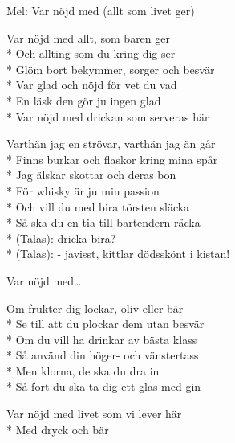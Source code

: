 \begin{SongText}
    \begin{SongInfo}
        Mel: Var nöjd med (allt som livet ger)
    \end{SongInfo}
    \begin{SongVerse}
        Var nöjd med allt, som baren ger\\*%
        Och allting som du kring dig ser\\*%
        Glöm bort bekymmer, sorger och besvär\\*%
        Var glad och nöjd för vet du vad\\*%
        En läsk den gör ju ingen glad\\*%
        Var nöjd med drickan som serveras här
    \end{SongVerse}
    \begin{SongVerse}
        Varthän jag en strövar, varthän jag än går\\*%
        Finns burkar och flaskor kring mina spår\\*%
        Jag älskar skottar och deras bon\\*%
        För whisky är ju min passion\\*%
        Och vill du med bira törsten släcka\\*%
        Så ska du en tia till bartendern räcka\\*%
        (Talas): dricka bira?\\*%
        (Talas): - javisst, kittlar dödsskönt i kistan!
    \end{SongVerse}
    \begin{SongVerse}
        Var nöjd med…
    \end{SongVerse}
    \begin{SongVerse}
        Om frukter dig lockar, oliv eller bär\\*%
        Se till att du plockar dem utan besvär\\*%
        Om du vill ha drinkar av bästa klass\\*%
        Så använd din höger- och vänstertass\\*%
        Men klorna, de ska du dra in\\*%
        Så fort du ska ta dig ett glas med gin
    \end{SongVerse}
    \begin{SongVerse}
        Var nöjd med livet som vi lever här\\*%
        Med dryck och bär
    \end{SongVerse}
\end{SongText}
